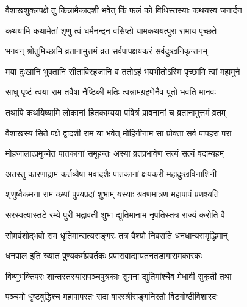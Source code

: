 \hyperref[sec:ekadashi_mahatmyam_vrata_raja]{\closesub}
\clearpage

\label{sec:vrata-raja-vaishakha-shukla-mohini}


\twolineshloka
{वैशाखशुक्लपक्षे तु किन्नामैकादशी भवेत्}
{किं फलं को विधिस्तस्याः कथयस्व जनार्दन} %


\twolineshloka
{कथयामि कथामेतां शृणु त्वं धर्मनन्दन}
{वसिष्ठो यामकथयत्पुरा रामाय पृच्छते} %


\twolineshloka
{भगवन् श्रोतुमिच्छामि व्रतानामुत्तमं व्रत}
{सर्वपापक्षयकरं सर्वदुःखनिकृन्तनम्} %

\twolineshloka
{मया दुःखानि भुक्तानि सीताविरहजानि व}
{ततोऽहं भयभीतोऽस्मि पृच्छामि त्वां महामुने} %


\twolineshloka
{साधु पृष्टं त्वया राम तवैषा नैष्ठिकी मतिः}
{त्वन्नामग्रहणेनैव पूतो भवति मानवः} %

\twolineshloka
{तथापि कथयिष्यामि लोकानां हितकाम्यया}
{पवित्रं प्रावनानां च व्रतानामुत्तमं व्रतम्} %

\twolineshloka
{वैशाखस्य सिते पक्षे द्वादशी राम या भवेत्}
{मोहिनीनाम सा प्रोक्ता सर्व पापहरा परा} %

\twolineshloka
{मोहजालात्प्रमुच्येत पातकानां समूहन्तः}
{अस्या व्रतप्रभावेण सत्यं सत्यं वदाम्यहम्} %

\twolineshloka
{अतस्तु कारणाद्राम कर्तव्यैषा भवादशैः}
{पातकानां क्षयकरी महादुःखविनाशिनी} %

\twolineshloka
{शृणुष्वैकमना राम कथां पुण्यप्रदां शुभाम्}
{यस्याः श्रवणमात्रण महापापं प्रणश्यति} %

\twolineshloka
{सरस्वत्यास्तटे रम्ये पुरी भद्रावती शुभा}
{द्युतिमानाम नृपतिस्तत्र राज्यं करोति वै} %

\twolineshloka
{सोमवंशोद्भवो राम धृतिमान्सत्यसङ्गरः}
{तत्र वैश्यो निवसति धनधान्यसमृद्धिमान्} %

\twolineshloka
{धनपाल इति ख्यात पुण्यकर्मप्रवर्तकः}
{प्रपासवाद्यायतनतडागारामकारकः} %

\twolineshloka
{विष्णुभक्तिपरः शान्तस्तस्यांसपञ्चपुत्रकाः}
{सुमना द्युतिमांश्चैव मेधावी सुकृती तथा} %

\twolineshloka
{पञ्चमो धृष्टबुद्धिश्च महापापरतः सदा}
{वारस्त्रीसङ्गनिरतो विटगोष्ठीविशारदः} %

